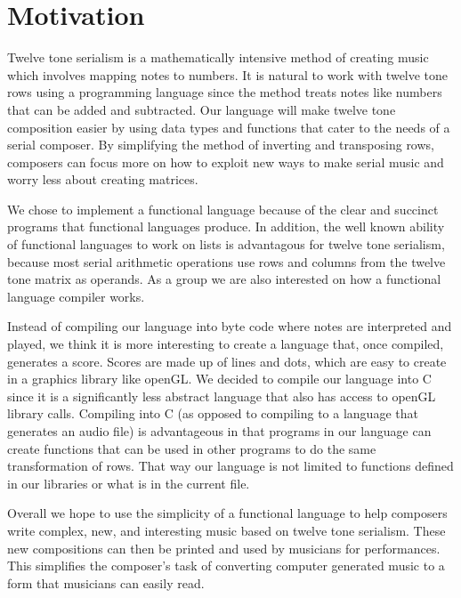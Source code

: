 \section{Motivation}

Twelve tone serialism is a mathematically intensive method of creating music which 
involves mapping notes to numbers. It is natural to work with twelve tone rows 
using a programming language since the method treats notes like numbers that 
can be added and subtracted. Our language will make twelve tone composition 
easier by using data types and functions that cater to the needs of a serial composer.
By simplifying the method of inverting and transposing rows, composers can focus 
more on how to exploit new ways to make serial music and worry less about 
creating matrices. 

We chose to implement a functional language because of the clear and 
succinct programs that functional languages produce. In addition, the well known ability
of functional languages to work on lists is advantagous for twelve tone serialism, because
most serial arithmetic operations use rows and columns from the twelve tone matrix as operands. 
As a group we are also interested on how a functional language compiler works. 

Instead of compiling our language into byte code where notes are interpreted and 
played, we think it is more interesting to create a language that, once compiled, 
generates a score. Scores are made up of lines and dots, which are easy to create in 
a graphics library like openGL. We decided to compile our language into C since it is a 
significantly less abstract language that also has access to openGL library calls. Compiling into C
 (as opposed to compiling to a language that generates an audio file) is advantageous in 
that programs in our language can create functions that can be used in other programs to do the same 
transformation of rows. That way our language is not limited to functions defined in 
our libraries or what is in the current file. 

Overall we hope to use the simplicity of a functional language to help composers write 
complex, new, and interesting music based on twelve tone serialism. These new compositions 
can then be printed and used by musicians for performances. This simplifies the composer's task of 
converting computer generated music to a form that musicians can easily read. 
